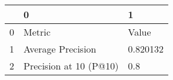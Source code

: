 \begin{tabular}{lll}
\toprule
{} &                       0 &         1 \\
\midrule
0 &                  Metric &     Value \\
1 &       Average Precision &  0.820132 \\
2 &  Precision at 10 (P@10) &       0.8 \\
\bottomrule
\end{tabular}
